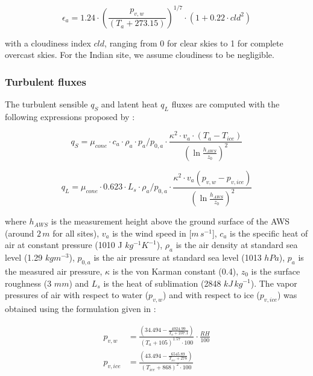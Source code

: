 \documentclass[utf8]{frontiersSCNS}
\begin{document}
\begin{equation}
	\epsilon_a=1.24 \cdot (\frac{p_{v,w}}{(T_a+273.15)})^{1/7}\cdot(1+0.22\cdot{cld}^2) \label{eqn:atm_e}
\end{equation}

with a cloudiness index $cld$, ranging from 0 for clear skies to 1 for complete overcast skies. For the Indian
site, we assume cloudiness to be negligible.

\subsubsection{Turbulent fluxes} \label{sec:Qs}

The turbulent sensible $q_{S}$ and latent heat $q_{L}$ fluxes are computed with the following expressions
proposed by \cite{Garratt_1992}:

\begin{equation}
	q_{S}=\mu_{cone}\cdot c_{a} \cdot \rho_{a} \cdot p_{a}/p_{0,a} \cdot \frac{\kappa^2 \cdot v_a \cdot
		(T_a-T_{ice})}{{(\ln{\frac{h_{AWS}}{z_{0}}})}^2}
	\label{eqn:qs}
\end{equation}

\begin{equation}
	q_{L}=\mu_{cone}\cdot 0.623 \cdot L_s \cdot \rho_{a}/p_{0,a} \cdot \frac{\kappa^2 \cdot
	v_a(p_{v,w}-p_{v,ice})}{{(\ln{\frac{h_{AWS}}{z_{0}}})}^2}
\end{equation}

where $h_{AWS}$ is the measurement height above the ground surface of the AWS (around $2\,m$ for all sites),
$v_a$ is the wind speed in [$m\,s^{-1}$], $c_a$ is the specific heat of air at constant pressure (1010 J
$kg^{-1} K^{-1}$), $\rho_{a}$ is the air density at standard sea level (1.29 $kg m^{-3}$), $p_{0,a}$ is the air
pressure at standard sea level (1013 $hPa$), $p_{a}$ is the measured air pressure, $\kappa$ is the von Karman constant (0.4), $z_{0}$ is the surface
roughness (3 $mm$) and $L_s$ is the heat of sublimation (2848 $kJ\,kg^{-1}$).  The vapor pressures of air with
respect to water ($p_{v,w}$) and with respect to ice ($p_{v,ice}$) was obtained using the formulation given in
\cite{huang_2018} :

\begin{equation}
	\begin{split}
		p_{v,w}&=\frac{(34.494 - \frac{4924.99}{T_{a} + 237.1})}{(T_a + 105)^{1.57} \cdot 100} \cdot \frac{RH}{100} \\
		p_{v,ice}&=\frac{(43.494 - \frac{6545.89}{T_{ice} + 278})}{(T_{ice} + 868)^{2} \cdot 100} \\
	\end{split} \label{eqn:vp}
\end{equation}
\end{document}
